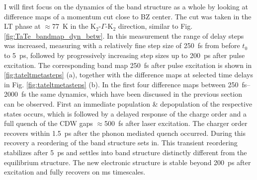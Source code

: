 I will first focus on the dynamics of the band structure as a whole by looking at difference maps of a momentum cut close to BZ center.
The cut was taken in the LT phase at $\approx$\qty{77}{\kelvin} in the  K$_2$-$\Gamma$-K$_2$ direction, similar to Fig. \ref{fig:TaTe_bandmap_dyn_betw}.
In this measurement the range of delay steps was increased, measuring with a relatively fine step size of \qty{250}{\femto\second} from before $t_0$ to \qty{5}{\pico\second}, followed by progressively increasing step sizes up to \qty{200}{\pico\second} after pulse excitation.
The corresponding band map \qty{250}{\femto\second} after pulse excitation is shown in \ref{fig:tateltmetasteps} (a), together with the difference maps at selected time delays in Fig. \ref{fig:tateltmetasteps} (b).
In the first four difference maps between \qtyrange{250}{2000}{\femto\second} the same dynamics, which have been discussed in the previous section can be observed.
First an immediate population \& depopulation of the respective states occurs, which is followed by a delayed response of the charge order and a full quench of the CDW gaps $\approx$\qty{500}{\femto\second} after laser excitation.
The charger order recovers within \qty{1.5}{\pico\second} after the phonon mediated quench occurred.
During this recovery a reordering of the band structure sets in.
This transient reordering stabilizes after \qty{5}{\pico\second} and settles into band structure distinctly different from the equilibrium structure.
The new electronic structure is stable beyond \qty{200}{\pico\second} after excitation and fully recovers on \unit{\milli\second} timescales.

